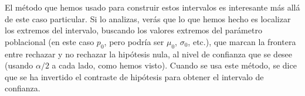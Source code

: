 El método que hemos usado para construir estos intervalos es interesante más allá de este caso particular. Si lo analizas, verás que lo que hemos hecho es localizar los extremos del intervalo, buscando los valores extremos del parámetro poblacional (en este caso $p_0$, pero podría ser $\mu_0$, $\sigma_0$, etc.), que marcan la frontera entre rechazar y no rechazar la hipótesis nula, al nivel de confianza que se desee (usando $\alpha/2$ a cada lado, como hemos visto). Cuando se usa este método, se dice que se ha {\sf invertido} el contraste de hipótesis para obtener el intervalo de confianza.


%
%
